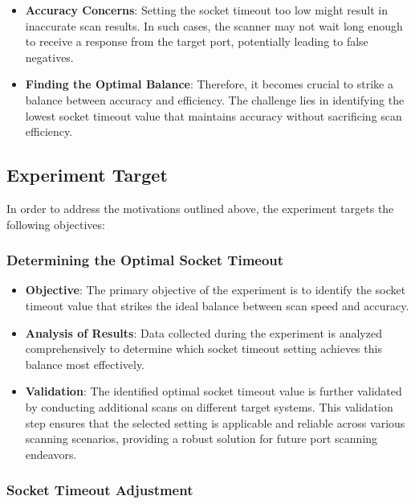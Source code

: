 \begin{itemize}
  \item \textbf{Accuracy Concerns}: Setting the socket timeout too low might result in inaccurate scan results. In such cases, the scanner may not wait long enough to receive a response from the target port, potentially leading to false negatives.

  \item \textbf{Finding the Optimal Balance}: Therefore, it becomes crucial to strike a balance between accuracy and efficiency. The challenge lies in identifying the lowest socket timeout value that maintains accuracy without sacrificing scan efficiency.
\end{itemize}

\subsection{Experiment Target}

In order to address the motivations outlined above, the experiment targets the following objectives:

\subsubsection{Determining the Optimal Socket Timeout}

\begin{itemize}
  \item \textbf{Objective}: The primary objective of the experiment is to identify the socket timeout value that strikes the ideal balance between scan speed and accuracy.
  
  \item \textbf{Analysis of Results}: Data collected during the experiment is analyzed comprehensively to determine which socket timeout setting achieves this balance most effectively.
  
  \item \textbf{Validation}: The identified optimal socket timeout value is further validated by conducting additional scans on different target systems. This validation step ensures that the selected setting is applicable and reliable across various scanning scenarios, providing a robust solution for future port scanning endeavors.
\end{itemize}

\subsubsection{Socket Timeout Adjustment}

